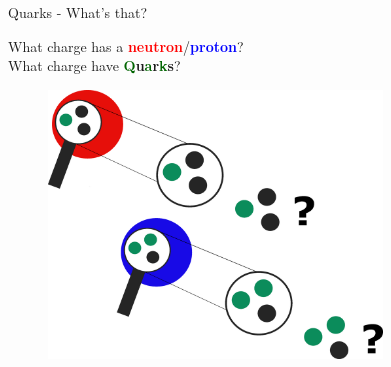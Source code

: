 \begin{frame}{Quarks - What's that?}

    \begin{minipage}[t]{\linewidth}\raggedleft
          What charge has a \textcolor{red}{\textbf{neutron}}/\textcolor{blue}{\textbf{proton}}? \\
           What charge have \textcolor{darkgreen}{\textbf{Q}}\textbf{u}\textcolor{darkgreen}{\textbf{a}}\textbf{r}\textcolor{darkgreen}{\textbf{k}}\textbf{s}?
    \end{minipage}%
    \vspace{-0.6cm}
    \begin{minipage}{\linewidth}\raggedright
        \begin{figure}[htb]
            \includegraphics[width=0.79\textwidth]{Figures Introductory Lecture/Standard Model/Quarks.png}
            \label{fig:quarks}
        \end{figure}            
    \end{minipage}
    
\end{frame}


